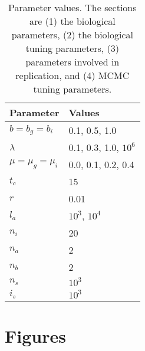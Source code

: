 \documentclass{article}
\begin{document}
\begin{table}
  \centering 
  \begin{tabular}{l l}
    \hline
    Parameter             & Values \\
    \hline
    \hline
    $b = b_g = b_i$       & 0.1, 0.5, 1.0 \\
    $\lambda$             & 0.1, 0.3, 1.0, $10^6$ \\
    $\mu = \mu_g = \mu_i$ & 0.0, 0.1, 0.2, 0.4 \\
    \hline
    $t_c$                 & 15 \\
    $r$                   & 0.01 \\
    $l_a$                 & $10^3$, $10^4$ \\
    \hline
    $n_i$                 & 20 \\
    $n_a$                 & 2 \\
    $n_b$                 & 2 \\
    \hline
    $n_s$                 & $10^3$ \\
    $i_s$                 & $10^3$ \\
    \hline
  \end{tabular}
  \caption{
    Parameter values. The sections are (1) the biological parameters, (2) the
    biological tuning parameters, (3) parameters involved in replication, 
    and (4) MCMC tuning parameters.
  }
  \label{table:parameter_values}
\end{table}

\section{Figures}
\end{document}
